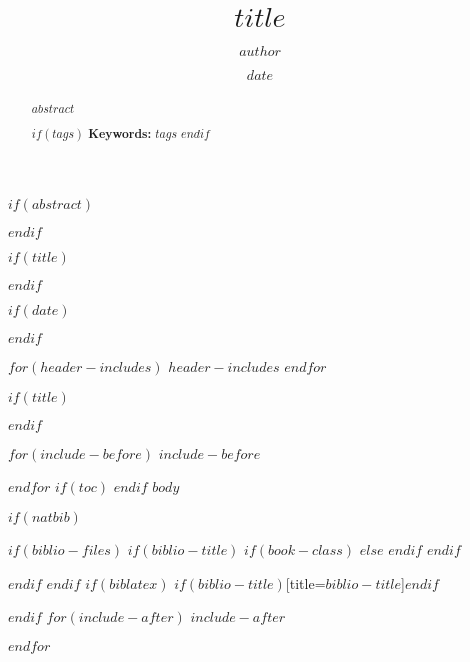 \documentclass[aps,pra,onecolumn,notitlepage]{revtex4-1}
\begin{document}
$if(abstract)$

\begin{abstract}
$abstract$

$if(tags)$
\textbf{Keywords: } $tags$
$endif$
\end{abstract}
$endif$

$if(title)$
\title{$title$}
$endif$
\author{$author$}

$if(date)$
\date{$date$}
$endif$


$for(header-includes)$
$header-includes$
$endfor$

$if(title)$
\maketitle
$endif$

\tableofcontents

$for(include-before)$
$include-before$

$endfor$
$if(toc)$
{
\hypersetup{linkcolor=blue}
\setcounter{tocdepth}{$toc-depth$}
\tableofcontents
}
$endif$
$body$

$if(natbib)$

$if(biblio-files)$
$if(biblio-title)$
$if(book-class)$
\renewcommand\bibname{$biblio-title$}
$else$
\renewcommand\refname{$biblio-title$}
$endif$
$endif$


$endif$
$endif$
$if(biblatex)$
\printbibliography$if(biblio-title)$[title=$biblio-title$]$endif$

$endif$
$for(include-after)$
$include-after$

$endfor$
\end{document}
